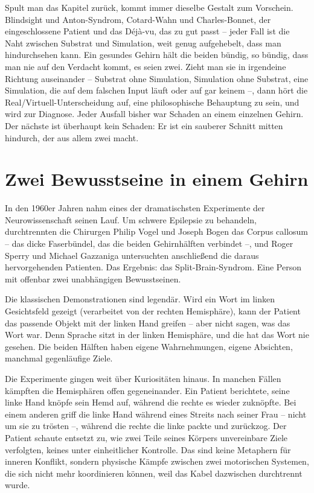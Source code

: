 \documentclass[11pt, twoside, openright]{book}
\begin{document}
Spult man das Kapitel zurück, kommt immer dieselbe Gestalt zum Vorschein. Blindsight und Anton-Syndrom, Cotard-Wahn und Charles-Bonnet, der eingeschlossene Patient und das Déjà-vu, das zu gut passt -- jeder Fall ist die Naht zwischen Substrat und Simulation, weit genug aufgehebelt, dass man hindurchsehen kann. Ein gesundes Gehirn hält die beiden bündig, so bündig, dass man nie auf den Verdacht kommt, es seien zwei. Zieht man sie in irgendeine Richtung auseinander -- Substrat ohne Simulation, Simulation ohne Substrat, eine Simulation, die auf dem falschen Input läuft oder auf gar keinem --, dann hört die Real/Virtuell-Unterscheidung auf, eine philosophische Behauptung zu sein, und wird zur Diagnose. Jeder Ausfall bisher war Schaden an einem einzelnen Gehirn. Der nächste ist überhaupt kein Schaden: Er ist ein sauberer Schnitt mitten hindurch, der aus allem zwei macht.

\chapter{Zwei Bewusstseine in einem Gehirn}

In den 1960er Jahren nahm eines der dramatischsten Experimente der Neurowissenschaft seinen Lauf. Um schwere Epilepsie zu behandeln, durchtrennten die Chirurgen Philip Vogel und Joseph Bogen das Corpus callosum -- das dicke Faserbündel, das die beiden Gehirnhälften verbindet --, und Roger Sperry und Michael Gazzaniga untersuchten anschließend die daraus hervorgehenden Patienten. Das Ergebnis: das Split-Brain-Syndrom. Eine Person mit offenbar zwei unabhängigen Bewusstseinen.

Die klassischen Demonstrationen sind legendär. Wird ein Wort im linken Gesichtsfeld gezeigt (verarbeitet von der rechten Hemisphäre), kann der Patient das passende Objekt mit der linken Hand greifen -- aber nicht sagen, was das Wort war. Denn Sprache sitzt in der linken Hemisphäre, und die hat das Wort nie gesehen. Die beiden Hälften haben eigene Wahrnehmungen, eigene Absichten, manchmal gegenläufige Ziele.

Die Experimente gingen weit über Kuriositäten hinaus. In manchen Fällen kämpften die Hemisphären offen gegeneinander. Ein Patient berichtete, seine linke Hand knöpfe sein Hemd auf, während die rechte es wieder zuknöpfte. Bei einem anderen griff die linke Hand während eines Streits nach seiner Frau -- nicht um sie zu trösten --, während die rechte die linke packte und zurückzog. Der Patient schaute entsetzt zu, wie zwei Teile seines Körpers unvereinbare Ziele verfolgten, keines unter einheitlicher Kontrolle. Das sind keine Metaphern für inneren Konflikt, sondern physische Kämpfe zwischen zwei motorischen Systemen, die sich nicht mehr koordinieren können, weil das Kabel dazwischen durchtrennt wurde.
\end{document}
